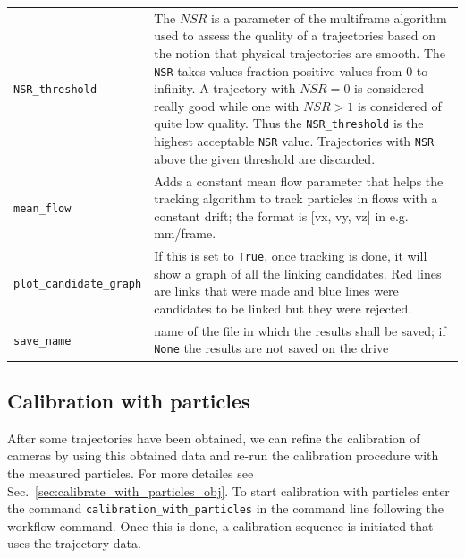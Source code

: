 \documentclass[10pt,a4paper]{article}
\begin{document}
\begin{table}[!ht]
\begin{tabular}{l m{12cm}}
		\texttt{NSR\_threshold} & The $NSR$ is a parameter of the multiframe algorithm used to assess the quality of a trajectories based on the notion that physical trajectories are smooth. The \texttt{NSR} takes values fraction positive values from 0 to infinity. A trajectory with $NSR=0$ is considered really good while one with $NSR>1$ is considered of quite low quality. Thus the \texttt{NSR\_threshold} is the highest acceptable \texttt{NSR} value. Trajectories with \texttt{NSR} above the given threshold are discarded. \\[.2cm]
		
		\texttt{mean\_flow} & Adds a constant mean flow parameter that
		helps the tracking algorithm to track particles in flows with a constant drift; the format is [vx, vy, vz] in e.g. mm/frame. \\[.2cm]
		
		\texttt{plot\_candidate\_graph} & If this is set to \verb|True|, once tracking is done, it will show a graph of all the linking candidates. Red lines are links that were made and blue lines were candidates to be linked but they were rejected. \\[.2cm]
		
		
		\texttt{save\_name} & name of the file in which the results shall be saved; if \texttt{None} the results are not saved on the drive\\
		
		\hline
	\end{tabular}
\end{table}





\subsection{Calibration with particles}\label{sec:workflow_calibration_with_particles}

After some trajectories have been obtained, we can refine the calibration of cameras by using this obtained data and re-run the calibration procedure with the measured particles. For more detailes see Sec.~\ref{sec:calibrate_with_particles_obj}. To start calibration with particles enter the command \texttt{calibration\_with\_particles} in the command line following the workflow command. Once this is done, a calibration sequence is initiated that uses the trajectory data.
\end{document}
